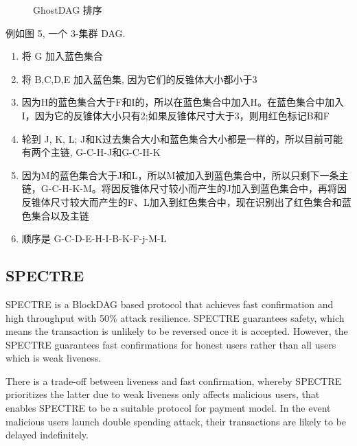\documentclass[a4paper,11pt]{article}
\begin{document}
\begin{figure}[ht]
	\centerline{%
	}
\caption{GhostDAG 排序}
\end{figure}

例如图 5, 一个 3-集群 DAG. 

\begin{enumerate}
	\item 将 G 加入蓝色集合 
	\item 将 B,C,D,E 加入蓝色集, 因为它们的反锥体大小都小于3 
	\item 因为H的蓝色集合大于F和I的，所以在蓝色集合中加入H。在蓝色集合中加入I，因为它的反锥体大小只有2;如果反锥体尺寸大于3，则用红色标记B和F 
	\item 轮到 J, K, L;	J和K过去集合大小和蓝色集合大小都是一样的，所以目前可能有两个主链, G-C-H-J和G-C-H-K 
	\item 因为M的蓝色集合大于J和L，所以M被加入到蓝色集合中，所以只剩下一条主链，G-C-H-K-M。将因反锥体尺寸较小而产生的J加入到蓝色集合中，再将因反锥体尺寸较大而产生的F、L加入到红色集合中，现在识别出了红色集合和蓝色集合以及主链
	\item 顺序是 G-C-D-E-H-I-B-K-F-j-M-L
\end{enumerate}

\subsection{SPECTRE}
SPECTRE\cite{SPECTRE} is a BlockDAG based protocol that achieves fast confirmation and high throughput with 50\% attack resilience. SPECTRE guarantees safety, which means the transaction is unlikely to be reversed once it is accepted. However, the SPECTRE guarantees fast confirmations for honest users rather than all users which is weak liveness.

There is a trade-off between liveness and fast confirmation, whereby SPECTRE prioritizes the latter due to weak liveness only affects malicious users, that enables SPECTRE to be a suitable protocol for payment model. In the event malicious users launch double spending attack, their transactions are likely to be delayed indefinitely.
\end{document}
